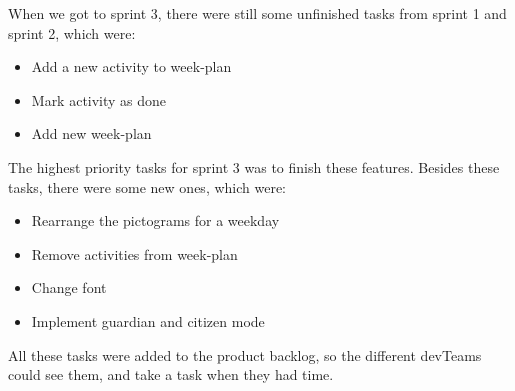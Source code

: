 When we got to sprint 3, there were still some unfinished tasks from sprint 1 and sprint 2, which were:

\begin{itemize}
    \item Add a new activity to week-plan
    \item Mark activity as done 
    \item Add new week-plan
\end{itemize}

The highest priority tasks for sprint 3 was to finish these features.
Besides these tasks, there were some new ones, which were:

\begin{itemize}
    \item Rearrange the pictograms for a weekday
    \item Remove activities from week-plan
    \item Change font
    \item Implement guardian and citizen mode
\end{itemize}

All these tasks were added to the product backlog, so the different \glspl{devTeam} could see them, and take a task when they had time.